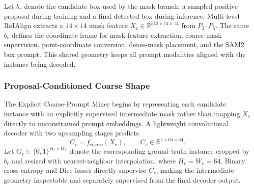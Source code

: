 \documentclass[letterpaper,journal]{IEEEtran}
\begin{document}
Let $b_r$ denote the candidate box used by the mask branch: a sampled positive proposal during
training and a final detected box during inference. Multi-level RoIAlign extracts a
$14\times14$ mask feature $X_r\in\mathbb{R}^{512\times14\times14}$ from $P_2$--$P_5$. The same
$b_r$ defines the coordinate frame for mask feature extraction, coarse-mask supervision,
point-coordinate conversion, dense-mask placement, and the SAM2 box prompt. This shared
geometry keeps all prompt modalities aligned with the instance being decoded.

\subsubsection{Proposal-Conditioned Coarse Shape}
The Explicit Coarse-Prompt Miner begins by representing each candidate instance with an
explicitly supervised intermediate mask rather than mapping $X_r$ directly to unconstrained
prompt embeddings. A lightweight convolutional decoder with two upsampling stages predicts
\begin{equation}
C_r=f_{\mathrm{coarse}}(X_r), \qquad
C_r\in\mathbb{R}^{1\times64\times64}.
\label{eq:coarse_logits}
\end{equation}
Let $G_r\in\{0,1\}^{H_c\times W_c}$ denote the corresponding ground-truth instance cropped by
$b_r$ and resized with nearest-neighbor interpolation, where $H_c=W_c=64$. Binary cross-entropy
and Dice losses directly supervise $C_r$, making the intermediate geometry inspectable and
separately supervised from the final decoder output.
\end{document}
